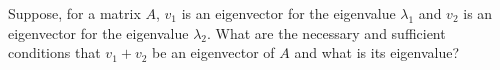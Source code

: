\begin{exercise}
  \label{ex:hw06:sums-of-eigenvectors}
  Suppose, for a matrix \(A\), \(v_1\) is an eigenvector for the eigenvalue
  \(\lambda_1\) and \(v_2\) is an eigenvector for the eigenvalue
  \(\lambda_2\). What are the necessary and sufficient conditions that
  \(v_1+v_2\) be an eigenvector of \(A\) and what is its eigenvalue?
\end{exercise}
